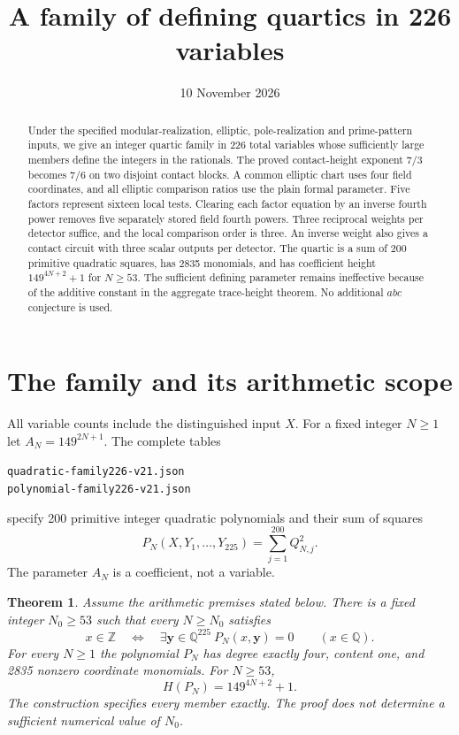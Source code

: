 \documentclass[11pt,a4paper]{article}
\title{A family of defining quartics in 226 variables}
\author{}\date{10 November 2026}
\newtheorem{theorem}{Theorem}[section]\newtheorem{lemma}[theorem]{Lemma}
\newcommand{\Q}{\mathbb Q}\newcommand{\Z}{\mathbb Z}\newcommand{\HH}{\mathcal H}
\begin{document}
\maketitle
\begin{abstract}
Under the specified modular-realization, elliptic, pole-realization and
prime-pattern inputs, we give an integer quartic family in 226 total
variables whose sufficiently large members define the integers in the
rationals. The proved contact-height exponent $7/3$ becomes $7/6$ on
two disjoint contact blocks. A common elliptic chart uses four field
coordinates, and all elliptic comparison ratios use the plain formal
parameter. Five factors represent sixteen local tests. Clearing each
factor equation by an inverse fourth power removes five separately
stored field fourth powers. Three reciprocal weights per detector
suffice, and the local comparison order is three. An inverse weight
also gives a contact circuit with three scalar outputs per detector.
The quartic is a sum of 200 primitive quadratic squares, has 2835
monomials, and has coefficient height $149^{4N+2}+1$ for $N\ge53$.
The sufficient defining parameter remains ineffective because of the
additive constant in the aggregate trace-height theorem. No additional
$abc$ conjecture is used.
\end{abstract}

\section{The family and its arithmetic scope}
All variable counts include the distinguished input $X$. For a fixed
integer $N\ge1$ let $A_N=149^{2N+1}$. The complete tables
\begin{center}\small
\nolinkurl{quadratic-family226-v21.json}\\
\nolinkurl{polynomial-family226-v21.json}
\end{center}
specify 200 primitive integer
quadratic polynomials and their sum of squares
\[
 P_N(X,Y_1,\ldots,Y_{225})=\sum_{j=1}^{200}Q_{N,j}^2.
\]
The parameter $A_N$ is a coefficient, not a variable.

\begin{theorem}\label{thm:main}
Assume the arithmetic premises stated below. There is a fixed integer
$N_0\ge53$ such that every $N\ge N_0$ satisfies
\[
 x\in\Z\quad\Longleftrightarrow\quad
 \exists\mathbf y\in\Q^{225}\ P_N(x,\mathbf y)=0
 \qquad(x\in\Q).
\]
For every $N\ge1$ the polynomial $P_N$ has degree exactly four,
content one, and 2835 nonzero coordinate monomials. For $N\ge53$,
\[
                       H(P_N)=149^{4N+2}+1.
\]
The construction specifies every member exactly. The proof does not
determine a sufficient numerical value of $N_0$.
\end{theorem}
\end{document}
